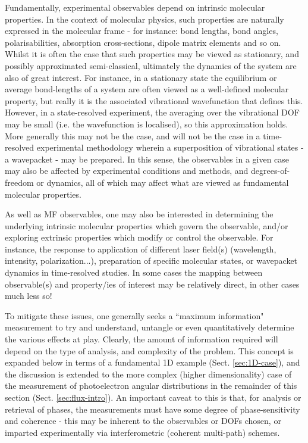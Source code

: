 \documentclass[10pt]{article}
\begin{document}
Fundamentally, experimental observables depend on intrinsic molecular properties. In the  context of molecular physics, such properties are naturally expressed in the molecular frame - for instance: bond lengths, bond angles, polarisabilities, absorption cross-sections, dipole matrix elements and so on. Whilst it is often the case that such properties may be viewed as stationary, and possibly approximated semi-classical, ultimately the dynamics of the system are also of great interest. For instance, in a stationary state the equilibrium or average bond-lengths of a system are often viewed as a well-defined molecular property, but really it is the associated vibrational wavefunction that defines this. However, in a state-resolved experiment, the averaging over the vibrational DOF may be small (i.e. the wavefunction is localised), so this approximation holds. More generally this may not be the case, and will not be the case in a time-resolved experimental methodology wherein a superposition of vibrational states  - a wavepacket - may be prepared. In this sense, the observables in a given case may also be affected by experimental conditions and methods, and degrees-of-freedom or dynamics, all of which may affect what are viewed as fundamental molecular properties. 

As well as MF observables, one may also be interested in determining the underlying intrinsic molecular properties which govern the observable, and/or exploring extrinsic properties which modify or control the observable. For instance, the response to application of different laser field(s) (wavelength, intensity, polarization...), preparation of specific molecular states, or wavepacket dynamics in time-resolved studies. In some cases the mapping between observable(s) and property/ies of interest may be relatively direct, in other cases much less so!

To mitigate these issues, one generally seeks a ``maximum information" measurement to try and understand, untangle or even quantitatively determine the various effects at play. Clearly, the amount of information required will depend on the type of analysis, and complexity of the problem. %
This concept is expanded below in terms of a fundamental 1D example (Sect. \ref{sec:1D-case}), and the discussion is extended to the more complex (higher dimensionality) case of the measurement of photoelectron angular distributions in the remainder of this section (Sect. \ref{sec:flux-intro}). An important caveat to this is that, for analysis or retrieval of phases, the measurements must have some degree of phase-sensitivity and coherence - this may be inherent to the observables or DOFs chosen, or imparted experimentally via  interferometric (coherent multi-path) schemes.
\end{document}
